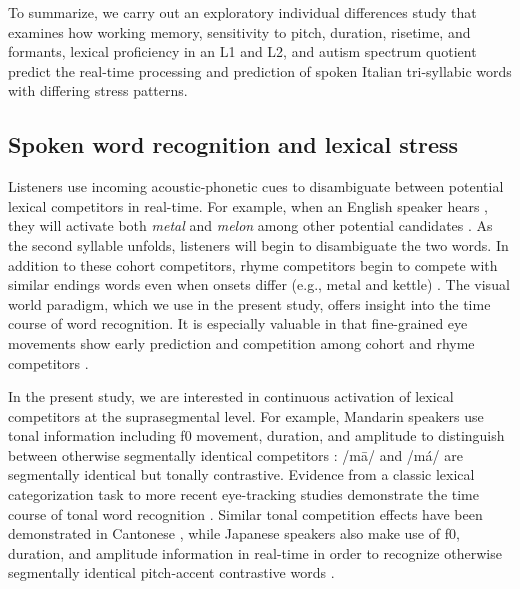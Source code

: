 To summarize, we carry out an exploratory individual differences study that examines how working memory, sensitivity to pitch, duration, risetime, and formants, lexical proficiency in an L1 and L2, and autism spectrum quotient predict the real-time processing and prediction of spoken Italian tri-syllabic words with differing stress patterns.

\subsection{Spoken word recognition and lexical stress}

Listeners use incoming acoustic-phonetic cues to disambiguate between potential lexical competitors in real-time. For example, when an English speaker hears , they will activate both \textit{metal} and \textit{melon} among other potential candidates \citep{Marslen1980}. As the second syllable unfolds, listeners will begin to disambiguate the two words. In addition to these cohort competitors, rhyme competitors begin to compete with similar endings words even when onsets differ (e.g., metal and kettle) \citep{Allopenna_1998}. The visual world paradigm, which we use in the present study, offers insight into the time course of word recognition. It is especially valuable in that fine-grained eye movements show early prediction and competition among cohort and rhyme competitors \citep{Allopenna_1998}.

In the present study, we are interested in continuous activation of lexical competitors at the suprasegmental level. For example, Mandarin speakers use tonal information including f0 movement, duration, and amplitude to distinguish between otherwise segmentally identical competitors \citep{Lee2008, Zhang2022}: /m\=a/ and /m\'a/ are segmentally identical but tonally contrastive. Evidence from a classic lexical categorization task \citep{fox_1985} to more recent eye-tracking studies demonstrate the time course of tonal word recognition \citep{zou_2022}. Similar tonal competition effects have been demonstrated in Cantonese \citep{qin_2022, Nixon2016}, while Japanese speakers also make use of f0, duration, and amplitude information in real-time in order to recognize otherwise segmentally identical pitch-accent contrastive words \citep{goss_2014, Cutler1999, Ito2024}.

